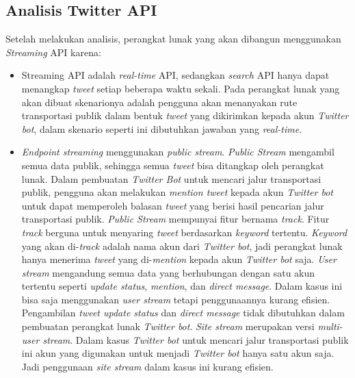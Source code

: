 \subsection{Analisis Twitter API}
Setelah melakukan analisis, perangkat lunak yang akan dibangun menggunakan \textit{Streaming} API karena:
\begin{itemize}
	\item Streaming API adalah \textit{real-time} API, sedangkan \textit{search} API hanya dapat menangkap \textit{tweet} setiap beberapa waktu sekali. Pada perangkat lunak yang akan dibuat skenarionya adalah pengguna akan menanyakan rute transportasi publik dalam bentuk \textit{tweet} yang dikirimkan kepada akun \textit{Twitter bot}, dalam skenario seperti ini dibutuhkan jawaban yang \textit{real-time}.
	\item \textit{Endpoint streaming} menggunakan \textit{public stream}. \textit{Public Stream} mengambil semua data publik, sehingga semua \textit{tweet} bisa ditangkap oleh perangkat lunak. Dalam pembuatan \textit{Twitter Bot} untuk mencari jalur transportasi publik, pengguna akan melakukan \textit{mention tweet} kepada akun \textit{Twitter bot} untuk dapat memperoleh balasan \textit{tweet} yang berisi hasil pencarian jalur transportasi publik. \textit{Public Stream} mempunyai fitur bernama \textit{track}. Fitur \textit{track} berguna untuk menyaring \textit{tweet} berdasarkan \textit{keyword} tertentu. \textit{Keyword} yang akan di-\textit{track} adalah nama akun dari \textit{Twitter bot}, jadi perangkat lunak hanya menerima \textit{tweet} yang di-\textit{mention} kepada akun \textit{Twitter bot} saja. \textit{User stream} mengandung semua data yang berhubungan dengan satu akun tertentu seperti \textit{update status}, \textit{mention}, dan \textit{direct message}. Dalam kasus ini bisa saja menggunakan \textit{user stream} tetapi penggunaannya kurang efisien. Pengambilan \textit{tweet update status} dan \textit{direct message} tidak dibutuhkan dalam pembuatan perangkat lunak \textit{Twitter bot}. \textit{Site stream} merupakan versi \textit{multi-user stream}. Dalam kasus \textit{Twitter bot} untuk mencari jalur transportasi publik ini akun yang digunakan untuk menjadi \textit{Twitter bot} hanya satu akun saja. Jadi penggunaan \textit{site stream} dalam kasus ini kurang efisien.
\end{itemize}

